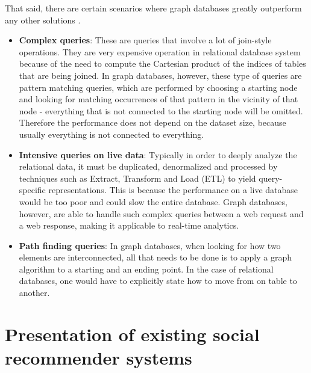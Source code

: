 \documentclass[12pt]{report}
\begin{document}
That said, there are certain scenarios where graph databases greatly outperform any other solutions \cite{learning_neo4j}. 
\begin{itemize}
\item {\bf Complex queries}: These are queries that involve a lot of join-style operations. They are very expensive operation in relational database system because of the need to compute the Cartesian product of the indices of tables that are being joined. In graph databases, however, these type of queries are pattern matching queries, which are performed by choosing a starting node and looking for matching occurrences of that pattern in the vicinity of that node - everything that is not connected to the starting node will be omitted. Therefore the performance does not depend on the dataset size, because usually everything is not connected to everything. 
\item {\bf Intensive queries on live data}: Typically in order to deeply analyze the relational data, it must be duplicated, denormalized and processed by techniques such as Extract, Transform and Load (ETL) to yield query-specific representations. This is because the performance on a live database would be too poor and could slow the entire database. Graph databases, however, are able to handle such complex queries between a web request and a web response, making it applicable to real-time analytics.
\item {\bf Path finding queries}: In graph databases, when looking for how two elements are interconnected, all that needs to be done is to apply a graph algorithm to a starting and an ending point. In the case of relational databases, one would have to explicitly state how to move from on table to another.
\end{itemize}




\chapter{Presentation of existing social recommender systems}
\end{document}

